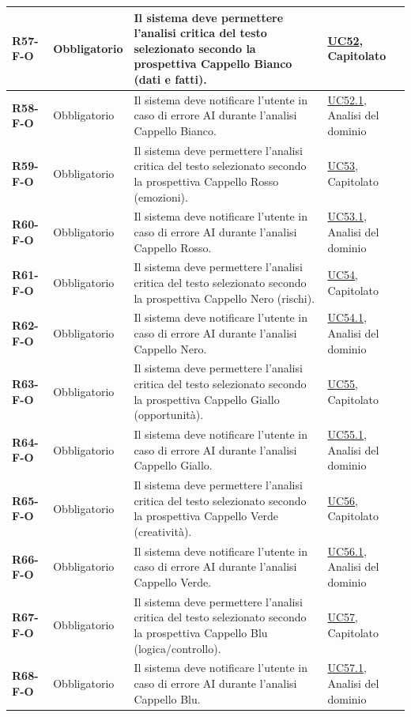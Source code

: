 \begin{longtable}{|p{2.5cm}|p{2.2cm}|p{6.8cm}|p{2.7cm}|}
	\textbf{R57-F-O} & Obbligatorio & Il sistema deve permettere l'analisi critica del testo selezionato secondo la prospettiva Cappello Bianco (dati e fatti). & \hyperlink{uc52}{UC52}, Capitolato \\ \hline
	\textbf{R58-F-O} & Obbligatorio & Il sistema deve notificare l'utente in caso di errore AI durante l'analisi Cappello Bianco. & \hyperlink{uc52.1}{UC52.1}, Analisi del dominio \\ \hline
	\textbf{R59-F-O} & Obbligatorio & Il sistema deve permettere l'analisi critica del testo selezionato secondo la prospettiva Cappello Rosso (emozioni). & \hyperlink{uc53}{UC53}, Capitolato \\ \hline
	\textbf{R60-F-O} & Obbligatorio & Il sistema deve notificare l'utente in caso di errore AI durante l'analisi Cappello Rosso. & \hyperlink{uc53.1}{UC53.1}, Analisi del dominio \\ \hline
	\textbf{R61-F-O} & Obbligatorio & Il sistema deve permettere l'analisi critica del testo selezionato secondo la prospettiva Cappello Nero (rischi). & \hyperlink{uc54}{UC54}, Capitolato \\ \hline
	\textbf{R62-F-O} & Obbligatorio & Il sistema deve notificare l'utente in caso di errore AI durante l'analisi Cappello Nero. & \hyperlink{uc54.1}{UC54.1}, Analisi del dominio \\ \hline
	\textbf{R63-F-O} & Obbligatorio & Il sistema deve permettere l'analisi critica del testo selezionato secondo la prospettiva Cappello Giallo (opportunità). & \hyperlink{uc55}{UC55}, Capitolato \\ \hline
	\textbf{R64-F-O} & Obbligatorio & Il sistema deve notificare l'utente in caso di errore AI durante l'analisi Cappello Giallo. & \hyperlink{uc55.1}{UC55.1}, Analisi del dominio \\ \hline
	\textbf{R65-F-O} & Obbligatorio & Il sistema deve permettere l'analisi critica del testo selezionato secondo la prospettiva Cappello Verde (creatività). & \hyperlink{uc56}{UC56}, Capitolato \\ \hline
	\textbf{R66-F-O} & Obbligatorio & Il sistema deve notificare l'utente in caso di errore AI durante l'analisi Cappello Verde. & \hyperlink{uc56.1}{UC56.1}, Analisi del dominio \\ \hline
	\textbf{R67-F-O} & Obbligatorio & Il sistema deve permettere l'analisi critica del testo selezionato secondo la prospettiva Cappello Blu (logica/controllo). & \hyperlink{uc57}{UC57}, Capitolato \\ \hline
	\textbf{R68-F-O} & Obbligatorio & Il sistema deve notificare l'utente in caso di errore AI durante l'analisi Cappello Blu. & \hyperlink{uc57.1}{UC57.1}, Analisi del dominio \\ \hline


\end{longtable}
